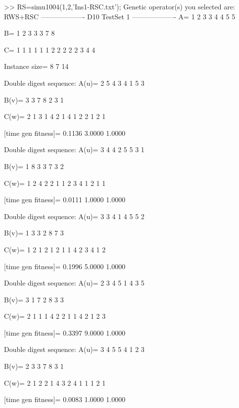 >> RS=simu1004(1,2,'Ins1-RSC.txt');
Genetic operator(s) you selected are:
RWS+RSC
------------------- D10 TestSet 1 -------------------
A=
     1     2     3     3     4     4     5     5

B=
     1     2     3     3     3     7     8

C=
     1     1     1     1     1     1     2     2     2     2     2     3     4     4

Instance size=
     8     7    14

Double digest sequence:
A(u)=
     2     5     4     3     4     1     5     3

B(v)=
     3     3     7     8     2     3     1

C(w)=
     2     1     3     1     4     2     1     4     1     2     2     1     2     1

[time gen fitness]=
    0.1136    3.0000    1.0000

Double digest sequence:
A(u)=
     3     4     4     2     5     5     3     1

B(v)=
     1     8     3     3     7     3     2

C(w)=
     1     2     4     2     2     1     1     2     3     4     1     2     1     1

[time gen fitness]=
    0.0111    1.0000    1.0000

Double digest sequence:
A(u)=
     3     3     4     1     4     5     5     2

B(v)=
     1     3     3     2     8     7     3

C(w)=
     1     2     1     2     1     2     1     1     4     2     3     4     1     2

[time gen fitness]=
    0.1996    5.0000    1.0000

Double digest sequence:
A(u)=
     2     3     4     5     1     4     3     5

B(v)=
     3     1     7     2     8     3     3

C(w)=
     2     1     1     1     4     2     2     1     1     4     2     1     2     3

[time gen fitness]=
    0.3397    9.0000    1.0000

Double digest sequence:
A(u)=
     3     4     5     5     4     1     2     3

B(v)=
     2     3     3     7     8     3     1

C(w)=
     2     1     2     2     1     4     3     2     4     1     1     1     2     1

[time gen fitness]=
    0.0083    1.0000    1.0000

